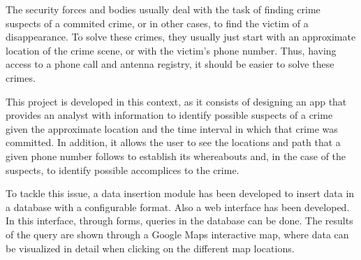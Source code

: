 The security forces and bodies usually deal with the task of finding crime suspects of a commited crime, or in other cases, to find the victim of a disappearance.
To solve these crimes, they usually just start with an approximate location of the crime scene, or with the victim's phone number.
Thus, having access to a phone call and antenna registry, it should be easier to solve these crimes.


This project is developed in this context, as it consists of designing an app that provides an analyst with information to identify possible suspects of a crime given the approximate location and the time interval in which that crime was committed.
In addition, it allows the user to see the locations and path that a given phone number follows to establish its whereabouts and, in the case of the suspects, to identify possible accomplices to the crime.

To tackle this issue, a data insertion module has been developed to insert data in a database with a configurable format. 
Also a web interface has been developed. In this interface, through forms, queries in the database can be done.
The results of the query are shown through a Google Maps interactive map, where data can be visualized in detail when clicking on the different map locations.


